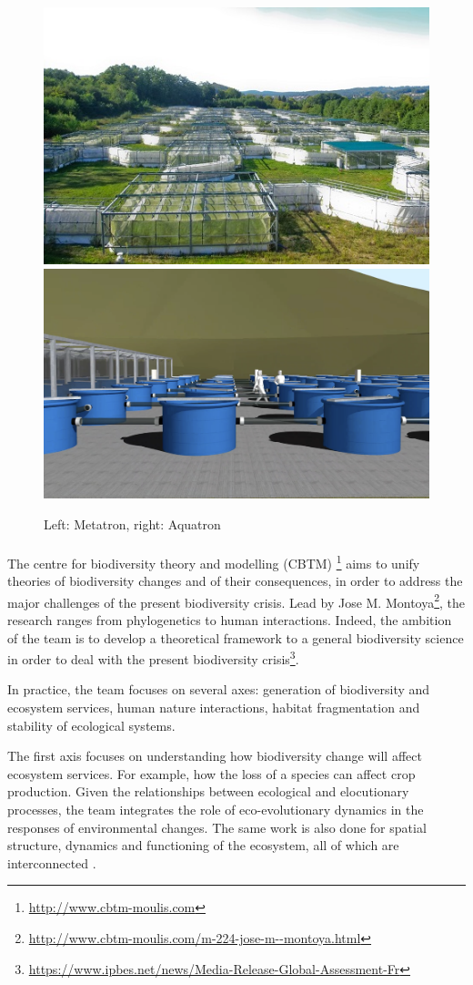 \documentclass{article}
\begin{document}
\begin{figure}[h]
\begin{center}
\includegraphics[width=6.cm]{metatron_0.jpg}
\includegraphics[width=6.cm]{aquatron.png}
\end{center}
\caption{\label{fig:temp}Left: Metatron, right: Aquatron}
\end{figure}



\paragraph{}
The centre for biodiversity theory and modelling (CBTM) \footnote{\url{http://www.cbtm-moulis.com}} aims to unify theories of biodiversity changes and of their consequences, in order to address the major challenges of the present biodiversity crisis. Lead by Jose M. Montoya\footnote{\url{http://www.cbtm-moulis.com/m-224-jose-m--montoya.html}}, the research ranges from phylogenetics to human interactions. Indeed, the ambition of the team is to develop a theoretical framework to a general biodiversity science in order to deal with the present biodiversity crisis\footnote{\url{https://www.ipbes.net/news/Media-Release-Global-Assessment-Fr}}.

In practice, the team focuses on several axes: generation of biodiversity and ecosystem services, human nature interactions, habitat fragmentation and stability of ecological systems.

The first axis focuses on understanding how biodiversity change will affect ecosystem services. For example, how the loss of a species can affect crop production. Given the relationships between ecological and elocutionary processes, the team integrates the role of eco-evolutionary dynamics in the responses of environmental changes. The same work is also done for spatial structure, dynamics and functioning of the ecosystem, all of which are interconnected \citep{bastazini_loss_2017, bideault_temperature_2019, galiana_geographical_2019}.
\end{document}
